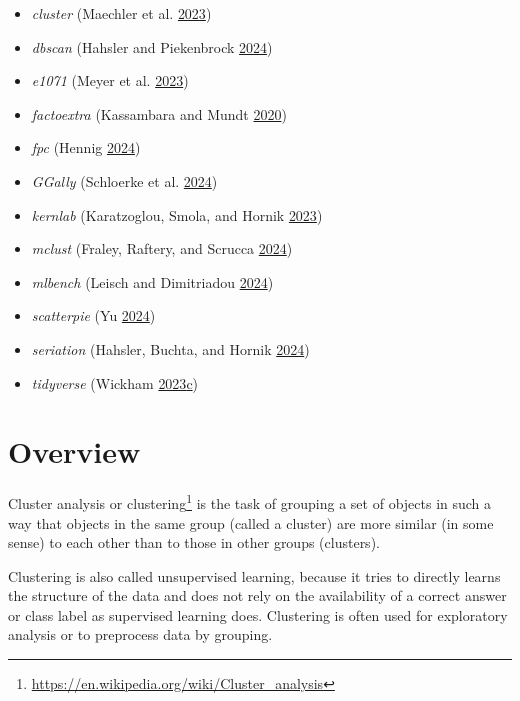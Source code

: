 \documentclass[
  notitlepage]{book}
\DeclareRobustCommand{\href}[2]{#2\footnote{\url{#1}}}
\providecommand{\tightlist}{%
  \setlength{\itemsep}{0pt}\setlength{\parskip}{0pt}}
\begin{document}
\begin{itemize}
\tightlist
\item
  \emph{cluster} (Maechler et al. \protect\hyperlink{ref-R-cluster}{2023})
\item
  \emph{dbscan} (Hahsler and Piekenbrock \protect\hyperlink{ref-R-dbscan}{2024})
\item
  \emph{e1071} (Meyer et al. \protect\hyperlink{ref-R-e1071}{2023})
\item
  \emph{factoextra} (Kassambara and Mundt \protect\hyperlink{ref-R-factoextra}{2020})
\item
  \emph{fpc} (Hennig \protect\hyperlink{ref-R-fpc}{2024})
\item
  \emph{GGally} (Schloerke et al. \protect\hyperlink{ref-R-GGally}{2024})
\item
  \emph{kernlab} (Karatzoglou, Smola, and Hornik \protect\hyperlink{ref-R-kernlab}{2023})
\item
  \emph{mclust} (Fraley, Raftery, and Scrucca \protect\hyperlink{ref-R-mclust}{2024})
\item
  \emph{mlbench} (Leisch and Dimitriadou \protect\hyperlink{ref-R-mlbench}{2024})
\item
  \emph{scatterpie} (Yu \protect\hyperlink{ref-R-scatterpie}{2024})
\item
  \emph{seriation} (Hahsler, Buchta, and Hornik \protect\hyperlink{ref-R-seriation}{2024})
\item
  \emph{tidyverse} (Wickham \protect\hyperlink{ref-R-tidyverse}{2023}\protect\hyperlink{ref-R-tidyverse}{c})
\end{itemize}

\hypertarget{overview}{%
\section{Overview}\label{overview}}

\href{https://en.wikipedia.org/wiki/Cluster_analysis}{Cluster analysis or clustering}
is the task of grouping a set of objects in such a way that objects in the same group (called a cluster) are more similar (in some sense) to each other than to those in other groups (clusters).

Clustering is also called unsupervised learning, because it tries to directly learns the structure of the data
and does not rely on the availability of a correct answer or class label as supervised learning does.
Clustering is often used for exploratory analysis or to preprocess data by grouping.
\end{document}
